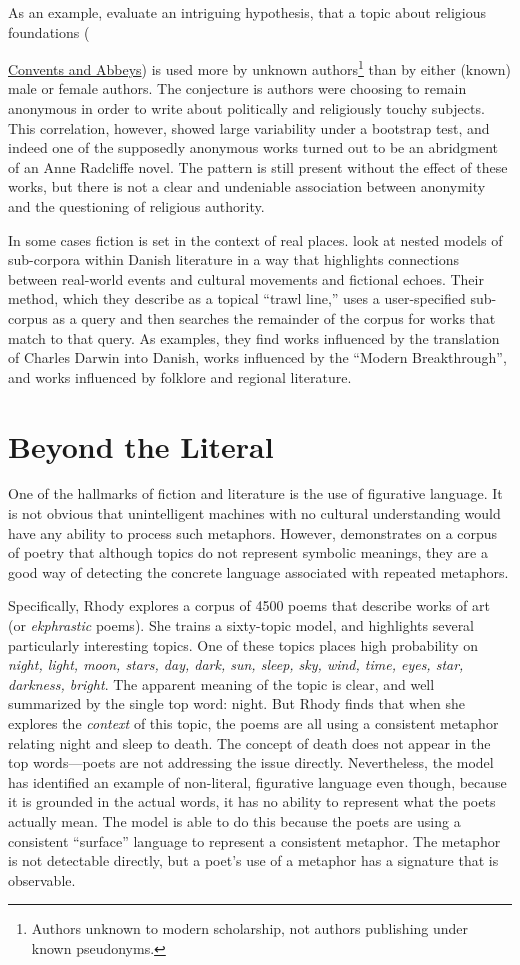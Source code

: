 As an example, \citet{jockers-13b} evaluate an intriguing hypothesis, that a topic about religious foundations ({\underline{Convents and Abbeys}) is used more by unknown authors\footnote{Authors unknown to modern scholarship, not authors publishing under known pseudonyms.} than by either (known) male or female authors.
The conjecture is authors were choosing to remain anonymous in order to write about politically and religiously touchy subjects.
This correlation, however, showed large variability under a bootstrap test, and indeed one of the supposedly anonymous works turned out to be an abridgment of an Anne Radcliffe novel.
The pattern is still present without the effect of these works, but there is not a clear and undeniable association between anonymity and the questioning of religious authority.

In some cases fiction is set in the context of real places.
\citet{tangherlini-13} look at nested models of sub-corpora within Danish literature in a way that highlights connections between real-world events and cultural movements and fictional echoes.
Their method, which they describe as a topical ``trawl line,'' uses a user-specified sub-corpus as a query and then searches the remainder of the corpus for works that match to that query.
As examples, they find works influenced by the translation of Charles Darwin into Danish, works influenced by the ``Modern Breakthrough'', and works influenced by folklore and regional literature.


\section{Beyond the Literal}

One of the hallmarks of fiction and literature is the use of figurative language.
It is not obvious that unintelligent machines with no cultural understanding would have any ability to process such metaphors. However, \citet{rhody-12} demonstrates on a corpus of poetry that although topics do not represent symbolic meanings, they are a good way of detecting the concrete language associated with repeated metaphors.

Specifically, Rhody explores a corpus of 4500 poems that describe works of art (or {\em ekphrastic} poems).
She trains a sixty-topic model, and highlights several particularly interesting topics.
One of these topics places high probability on {\em night, light, moon, stars, day, dark, sun, sleep, sky, wind, time, eyes, star, darkness, bright}.
The apparent meaning of the topic is clear, and well summarized by the single top word: night.
But Rhody finds that when she explores the {\em context} of this topic, the poems are all using a consistent metaphor relating night and sleep to death.
The concept of death does not appear in the top words---poets are not addressing the issue directly.
Nevertheless, the model has identified an example of non-literal, figurative language even though, because it is grounded in the actual words, it has no ability to represent what the poets actually mean.
The model is able to do this because the poets are using a consistent ``surface'' language to represent a consistent metaphor.
The metaphor is not detectable directly, but a poet's use of a metaphor has a signature that is observable.

}

